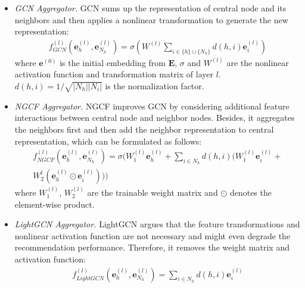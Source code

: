 \begin{itemize}
\item \textsl{GCN Aggregator.}
GCN \cite{kipf2016semi} sums up the representation of central node and its neighbors and then applies a nonlinear transformation to generate the new representation:
\begin{align}
f_{GCN}^{(l)}(\textbf{e}_h^{(l)}, \textbf{e}_{N_h}^{(l)}) = \sigma (W^{(l)} \sum_{i\in \{h\} \cup \{N_h\}} d(h,i) \textbf{e}_i^{(l)})
\label{GCN}
\end{align}
where $\mathbf{e}^{(0)}$ is the initial embedding from $\mathbf{E}$, 
$\sigma$ and $W^{(l)}$ are the nonlinear activation function and transformation matrix of layer $l$.
$d(h,i) = 1/\sqrt{|N_h||N_i|}$ is the normalization factor. 
\item \textsl{NGCF Aggregator.} NGCF \cite{wang2019neural} improves GCN by considering additional feature interactions between central node and neighbor nodes. Besides, it aggregates the neighbors first and then add the neighbor representation to central representation, which can be formulated as follows:
\begin{equation}
\begin{aligned}
f_{NGCF}^{(l)}(\textbf{e}_h^{(l)}, \textbf{e}_{N_h}^{(l)}) = \sigma(W_1^{(l)}\mathbf{e}_{h}^{(l)} + \sum_{i\in N_h} d(h,i)(W_1^{(l)}\textbf{e}_i^{(l)} + \\ W_2^l(\textbf{e}_h^{(l)} \odot \textbf{e}_{i}^{(l)})))
\label{NGCF}
\end{aligned}
\end{equation}
where $W_1^{(l)}$, $W_2^{(l)}$ are the trainable weight matrix and $\odot$ denotes the element-wise product. 
\item \textsl{LightGCN Aggregator.} LightGCN \cite{he2020lightgcn} argues that the feature transformations and nonlinear activation function are not necessary and might even degrade the recommendation performance. Therefore, it removes the weight matrix and activation function:
\begin{align}
f_{LightGCN}^{(l)}(\textbf{e}_h^{(l)}, \textbf{e}_{N_h}^{(l)})  = \sum_{i\in N_h} d(h,i) \textbf{e}_i^{(l)} 
\label{lightgcn}
\end{align}
\end{itemize}

